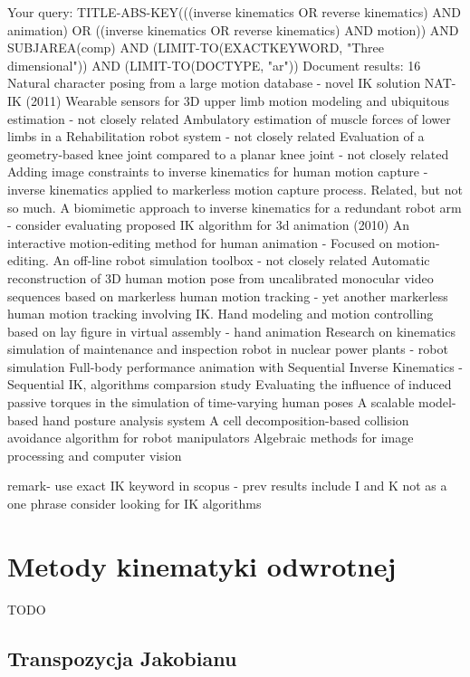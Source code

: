 \documentclass[11pt]{mwrep}
\begin{document}
    Your query:   TITLE-ABS-KEY(((inverse kinematics OR reverse kinematics) AND animation) OR ((inverse kinematics OR reverse kinematics) AND motion)) AND SUBJAREA(comp) AND (LIMIT-TO(EXACTKEYWORD, "Three dimensional")) AND (LIMIT-TO(DOCTYPE, "ar"))      Document results: 16
        Natural character posing from a large motion database - novel IK solution NAT-IK (2011)
        Wearable sensors for 3D upper limb motion modeling and ubiquitous estimation - not closely related
        Ambulatory estimation of muscle forces of lower limbs in a Rehabilitation robot system - not closely related
        Evaluation of a geometry-based knee joint compared to a planar knee joint - not closely related
        Adding image constraints to inverse kinematics for human motion capture - inverse kinematics applied to markerless motion capture process. Related, but not so much.
        A biomimetic approach to inverse kinematics for a redundant robot arm - consider evaluating proposed IK algorithm for 3d animation (2010)
        An interactive motion-editing method for human animation - Focused on motion-editing.
        An off-line robot simulation toolbox - not closely related
        Automatic reconstruction of 3D human motion pose from uncalibrated monocular video sequences based on markerless human motion tracking - yet another markerless human motion tracking involving IK.
        Hand modeling and motion controlling based on lay figure in virtual assembly - hand animation
        Research on kinematics simulation of maintenance and inspection robot in nuclear power plants - robot simulation
        Full-body performance animation with Sequential Inverse Kinematics - Sequential IK, algorithms comparsion study
        Evaluating the influence of induced passive torques in the simulation of time-varying human poses
        A scalable model-based hand posture analysis system
        A cell decomposition-based collision avoidance algorithm for robot manipulators
        Algebraic methods for image processing and computer vision



remark- use exact IK keyword in scopus - prev results include I and K not as a one phrase
consider looking for IK algorithms

  \section{Metody kinematyki odwrotnej}

    TODO


    \subsection{Transpozycja Jakobianu}
\end{document}
